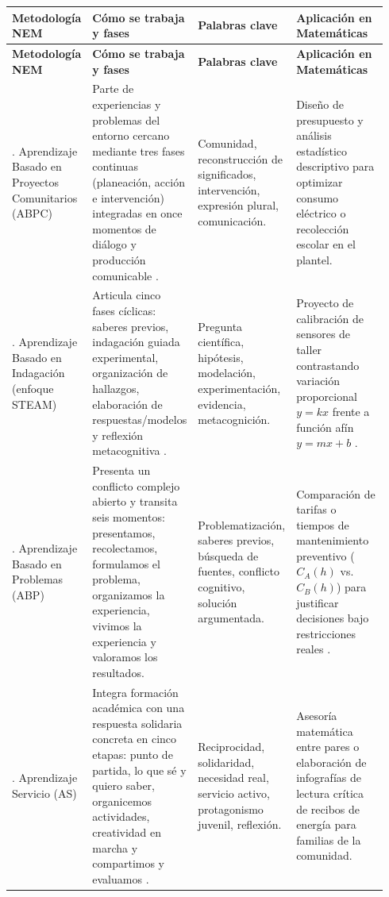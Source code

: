 \documentclass[spanish,letterpaper,oneside]{article}
\begin{document}
{\small{}\renewcommand{\arraystretch}{1.28}
\begin{longtable}{|>{\raggedright\arraybackslash}p{0.18\linewidth}|>{\raggedright\arraybackslash}p{0.28\linewidth}|>{\raggedright\arraybackslash}p{0.22\linewidth}|>{\raggedright\arraybackslash}p{0.26\linewidth}|}\hline
\rowcolor{iiiepePale} \textbf{Metodología NEM} & \textbf{Cómo se trabaja y fases} & \textbf{Palabras clave} & \textbf{Aplicación en Matemáticas} \\\hline
\endfirsthead
\hline
\rowcolor{iiiepePale} \textbf{Metodología NEM} & \textbf{Cómo se trabaja y fases} & \textbf{Palabras clave} & \textbf{Aplicación en Matemáticas} \\\hline
\endhead
1. Aprendizaje Basado en Proyectos Comunitarios (ABPC) & Parte de experiencias y problemas del entorno cercano mediante tres fases continuas (planeación, acción e intervención) integradas en once momentos de diálogo y producción comunicable \citep{sep2022sugerencias}. & Comunidad, reconstrucción de significados, intervención, expresión plural, comunicación. & Diseño de presupuesto y análisis estadístico descriptivo para optimizar consumo eléctrico o recolección escolar en el plantel. \\\hline
2. Aprendizaje Basado en Indagación (enfoque STEAM) & Articula cinco fases cíclicas: saberes previos, indagación guiada experimental, organización de hallazgos, elaboración de respuestas/modelos y reflexión metacognitiva \citep{sep2022sugerencias}. & Pregunta científica, hipótesis, modelación, experimentación, evidencia, metacognición. & Proyecto de calibración de sensores de taller contrastando variación proporcional $y=kx$ frente a función afín $y=mx+b$ \citep{sep2023pensamiento}. \\\hline
3. Aprendizaje Basado en Problemas (ABP) & Presenta un conflicto complejo abierto y transita seis momentos: presentamos, recolectamos, formulamos el problema, organizamos la experiencia, vivimos la experiencia y valoramos los resultados. & Problematización, saberes previos, búsqueda de fuentes, conflicto cognitivo, solución argumentada. & Comparación de tarifas o tiempos de mantenimiento preventivo ($C_A(h)$ vs. $C_B(h)$) para justificar decisiones bajo restricciones reales \citep{star2015algebra}. \\\hline
4. Aprendizaje Servicio (AS) & Integra formación académica con una respuesta solidaria concreta en cinco etapas: punto de partida, lo que sé y quiero saber, organicemos actividades, creatividad en marcha y compartimos y evaluamos \citep{sep2022sugerencias}. & Reciprocidad, solidaridad, necesidad real, servicio activo, protagonismo juvenil, reflexión. & Asesoría matemática entre pares o elaboración de infografías de lectura crítica de recibos de energía para familias de la comunidad. \\\hline
\end{longtable}}
\end{document}
